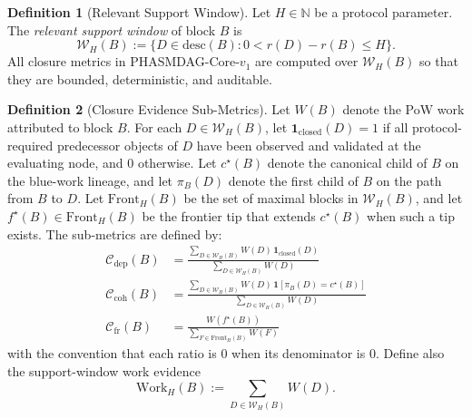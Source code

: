 \documentclass[11pt]{article}
\theoremstyle{definition}
\newtheorem{definition}{Definition}[section]
\theoremstyle{plain}
\theoremstyle{remark}
\newcommand{\Cdep}{\mathcal{C}_{\mathrm{dep}}}
\newcommand{\Ccoh}{\mathcal{C}_{\mathrm{coh}}}
\newcommand{\Cfr}{\mathcal{C}_{\mathrm{fr}}}
\begin{document}
\begin{definition}[Relevant Support Window]\label{def:support_window}
Let $H \in \mathbb{N}$ be a protocol parameter.
The \emph{relevant support window} of block $B$ is
\begin{equation}\label{eq:support_window}
\mathcal{W}_H(B) :=
\{D \in \mathrm{desc}(B) : 0 < r(D) - r(B) \le H\}.
\end{equation}
All closure metrics in PHASMDAG-Core-$v_1$ are computed over $\mathcal{W}_H(B)$ so
that they are bounded, deterministic, and auditable.
\end{definition}

\begin{definition}[Closure Evidence Sub-Metrics]\label{def:closure_submetrics}
Let $W(B)$ denote the PoW work attributed to block $B$.
For each $D \in \mathcal{W}_H(B)$, let $\mathbf{1}_{\mathrm{closed}}(D)=1$ if
all protocol-required predecessor objects of $D$ have been observed and
validated at the evaluating node, and $0$ otherwise.
Let $c^\star(B)$ denote the canonical child of $B$ on the blue-work lineage,
and let $\pi_B(D)$ denote the first child of $B$ on the path from $B$ to $D$.
Let $\mathrm{Front}_H(B)$ be the set of maximal blocks in $\mathcal{W}_H(B)$,
and let $f^\star(B) \in \mathrm{Front}_H(B)$ be the frontier tip that extends
$c^\star(B)$ when such a tip exists.
The sub-metrics are defined by:
\begin{align}
\Cdep(B)
&=
\frac{\sum_{D \in \mathcal{W}_H(B)} W(D)\,\mathbf{1}_{\mathrm{closed}}(D)}
{\sum_{D \in \mathcal{W}_H(B)} W(D)}
\label{eq:cdep} \\
\Ccoh(B)
&=
\frac{\sum_{D \in \mathcal{W}_H(B)} W(D)\,\mathbf{1}[\pi_B(D)=c^\star(B)]}
{\sum_{D \in \mathcal{W}_H(B)} W(D)}
\label{eq:ccoh} \\
\Cfr(B)
&=
\frac{W(f^\star(B))}
{\sum_{F \in \mathrm{Front}_H(B)} W(F)}
\label{eq:cfr}
\end{align}
with the convention that each ratio is $0$ when its denominator is $0$.
Define also the support-window work evidence
\begin{equation}\label{eq:work_window}
\mathrm{Work}_H(B) := \sum_{D \in \mathcal{W}_H(B)} W(D).
\end{equation}
\end{definition}
\end{document}
